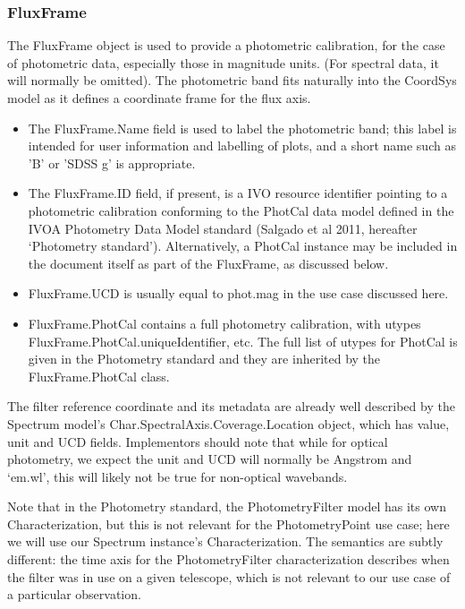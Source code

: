 \documentclass[11pt]{article}
\newcommand{\new}{\color{red}}
\begin{document}
{\new 
\subsubsection{FluxFrame}

The FluxFrame object is used to provide a photometric calibration, for the
case of photometric data, especially those in magnitude units. 
(For spectral data, it will normally be omitted).
The photometric band fits naturally into the CoordSys model as it defines
a coordinate frame for the flux axis.

\begin{itemize}
\item The FluxFrame.Name field is used to label the photometric band; this label is intended
for user information and labelling of plots, and a short name such as 'B' or 'SDSS g'
is appropriate. 

\item The FluxFrame.ID field, if present, is a IVO resource identifier
pointing to a photometric calibration conforming to the PhotCal data model defined in the
IVOA Photometry Data Model standard (Salgado et al 2011, hereafter `Photometry standard'). 
Alternatively, a PhotCal instance may
be included in the document itself as part of the FluxFrame, as discussed below. 

\item FluxFrame.UCD is usually equal to phot.mag in the use case discussed here. 

\item FluxFrame.PhotCal contains a full photometry calibration, with
utypes FluxFrame.PhotCal.uniqueIdentifier, etc. The full list of utypes
for PhotCal is given in the Photometry standard and they are inherited by the FluxFrame.PhotCal class.

\end{itemize}

The filter reference coordinate and its metadata are already well described
by the Spectrum model's Char.SpectralAxis.Coverage.Location object, which has value, unit and UCD fields.
Implementors should note that while for optical photometry, we expect the unit and UCD will normally be Angstrom 
and `em.wl', this will likely not be true for non-optical wavebands.

Note that in the Photometry standard, the
PhotometryFilter model has its own Characterization, but this is not relevant
for the PhotometryPoint use case; here we will use our Spectrum instance's Characterization.
The semantics are subtly different: the time axis for the PhotometryFilter characterization describes
when the filter was in use on a given telescope, which is not relevant to our use case of
a particular observation.

}
\end{document}
